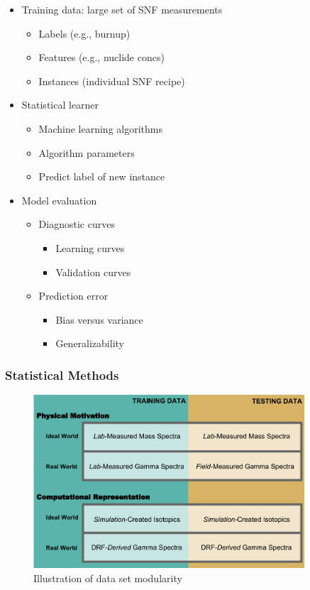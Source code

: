 \begin{frame}
\begin{minipage}{0.5\textwidth}
\begin{figure}
    \end{figure}
  \end{minipage}%
  \begin{minipage}{0.5\textwidth}
    \begin{itemize}
      \item Training data: large set of SNF measurements
      \begin{itemize}
        \item Labels (e.g., burnup)
        \item Features (e.g., nuclide concs)
        \item Instances (individual SNF recipe)
      \end{itemize}
      \item Statistical learner
      \begin{itemize}
        \item Machine learning algorithms
        \item Algorithm parameters
        \item Predict label of new instance
      \end{itemize}
      \item Model evaluation
      \begin{itemize}
        \item Diagnostic curves
        \begin{itemize}
          \item Learning curves
          \item Validation curves
        \end{itemize}
        \item Prediction error
        \begin{itemize}
          \item Bias versus variance
          \item Generalizability
        \end{itemize}
      \end{itemize}
    \end{itemize}
  \end{minipage}
\end{frame}

\begin{frame}
  \frametitle{Statistical Methods}
  \begin{figure}[h!]
    \centering
    \includegraphics[width=0.9\textwidth]{./figures/proposal.png}
    \caption{Illustration of data set modularity}
  \end{figure}
\end{frame}

